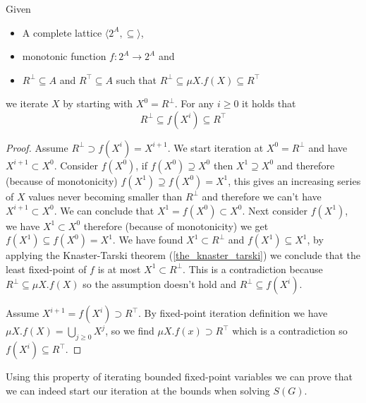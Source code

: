 \begin{lemma}
	\label{lem_fixpoint_bounds_mu}
	Given
	\begin{itemize}
		\item A complete lattice $\langle 2^A, \subseteq \rangle$,
		\item monotonic function $f : 2^A \rightarrow 2^A$ and
		\item $R^\bot \subseteq A$ and $R^\top \subseteq A$ such that $R^\bot \subseteq \mu X. f(X) \subseteq R^\top$
	\end{itemize}
	we iterate $X$ by starting with $X^0 = R^\bot$. For any $i \geq 0$ it holds that
	\[ R^\bot \subseteq f(X^i) \subseteq R^\top \]
	\begin{proof}
		Assume $R^\bot \supset f(X^i) = X^{i+1}$. We start iteration at $X^0 = R^\bot$ and have $X^{i+1} \subset X^0$. Consider $f(X^0)$, if $f(X^0) \supseteq X^0$ then $X^1 \supseteq X^0$ and therefore (because of monotonicity) $f(X^1) \supseteq f(X^0) = X^1$, this gives an increasing series of $X$ values never becoming smaller than $R^\bot$ and therefore we can't have $X^{i+1} \subset X^0$. We can conclude that $X^1 = f(X^0) \subset X^0$. Next consider $f(X^1)$, we have $X^1 \subset X^0$ therefore (because of monotonicity) we get $f(X^1) \subseteq f(X^0) = X^1$. We have found $X^1 \subset R^\bot$ and $f(X^1) \subseteq X^1$, by applying the Knaster-Tarski theorem (\ref{the_knaster_tarski}) we conclude that the least fixed-point of $f$ is at most $X^1 \subset R^\bot$. This is a contradiction because $R^\bot \subseteq \mu X.f(X)$ so the assumption doesn't hold and $R^\bot \subseteq f(X^i)$.
		
		Assume $X^{i+1} = f(X^i) \supset R^\top$. By fixed-point iteration definition we have $\mu X.f(X) = \bigcup_{j\geq0}X^j$, so we find $\mu X.f(x) \supset R^\top $ which is a contradiction so $f(X^i) \subseteq R^\top$.
	\end{proof}
\end{lemma}
Using this property of iterating bounded fixed-point variables we can prove that we can indeed start our iteration at the bounds when solving $S(G)$.
